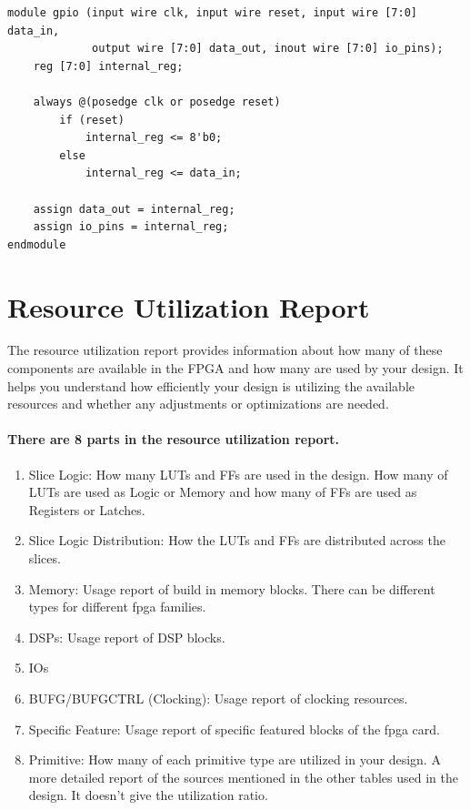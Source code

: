 \documentclass{report}
\begin{document}
\begin{verbatim}
module gpio (input wire clk, input wire reset, input wire [7:0] data_in,
             output wire [7:0] data_out, inout wire [7:0] io_pins);
    reg [7:0] internal_reg;
    
    always @(posedge clk or posedge reset)
        if (reset)
            internal_reg <= 8'b0;
        else
            internal_reg <= data_in;
    
    assign data_out = internal_reg;
    assign io_pins = internal_reg;
endmodule
\end{verbatim}

\section{Resource Utilization Report}

The resource utilization report provides information about how many of these components are available in the FPGA and how many are used by your design. It helps you understand how efficiently your design is utilizing the available resources and whether any adjustments or optimizations are needed.

\paragraph{There are 8 parts in the resource utilization report.}
\begin{enumerate}
    \item Slice Logic: How many LUTs and FFs are used in the design. How many of LUTs are used as Logic or Memory and how many of FFs are used as Registers or Latches.
    \item Slice Logic Distribution: How the LUTs and FFs are distributed across the slices.
    \item Memory: Usage report of build in memory blocks. There can be different types for different fpga families.
    \item DSPs: Usage report of DSP blocks.
    \item IOs
    \item BUFG/BUFGCTRL (Clocking): Usage report of clocking resources.
    \item Specific Feature: Usage report of specific featured blocks of the fpga card.
    \item Primitive: How many of each primitive type are utilized in your design. A more detailed report of the sources mentioned in the other tables used in the design. It doesn't give the utilization ratio.
\end{enumerate}
\end{document}
